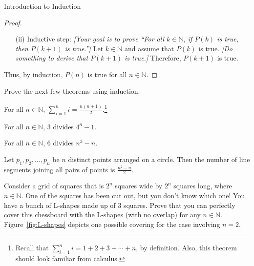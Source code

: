 \begin{section}{Introduction to Induction}
\begin{skeleton}
\begin{center}
{\begin{minipage}{6in}
\begin{proof}
\begin{enumerate}
\item[(ii)] Inductive step:  \emph{[Your goal is to prove ``For all $k\in\mathbb{N}$, if $P(k)$ is true, then $P(k+1)$ is true.'']} Let $k\in\mathbb{N}$ and assume that $P(k)$ is true. \emph{[Do something to derive that $P(k+1)$ is true.]} Therefore, $P(k+1)$ is true.
\end{enumerate}
Thus, by induction, $P(n)$ is true for all $n\in\mathbb{N}$.
\end{proof}
\end{minipage}
}
\end{center}
\end{skeleton}

Prove the next few theorems using induction.

\begin{theorem}
For all $n\in\mathbb{N}$, $\displaystyle \sum_{i=1}^{n}i=\frac{n(n+1)}{2}$.\footnote{Recall that $\displaystyle \sum_{i=1}^{n}i=1+2+3+\cdots +n$, by definition.  Also, this theorem should look familiar from calculus.}
\end{theorem}

\begin{theorem}
For all $n\in\mathbb{N}$, 3 divides $4^{n}-1$.
\end{theorem}

\begin{theorem}
For all $n\in\mathbb{N}$, 6 divides $n^{3}-n$.
\end{theorem}

\begin{theorem}
Let $p_{1}, p_{2}, \ldots, p_{n}$ be $n$ distinct points arranged on a circle.  Then the number of line segments joining all pairs of points is $\frac{n^{2}-n}{2}$.
\end{theorem}

\begin{problem}\label{prob:L-shapes}
Consider a grid of squares that is $2^n$ squares wide by $2^n$ squares long, where $n\in\mathbb{N}$. One of the squares has been cut out, but you don't know which one!  You have a bunch of L-shapes made up of $3$ squares.  Prove that you can perfectly cover this chessboard with the L-shapes (with no overlap) for any $n\in\mathbb{N}$. Figure~\ref{fig:L-shapes} depicts one possible covering for the case involving $n=2$.
\end{problem}


\end{section}
